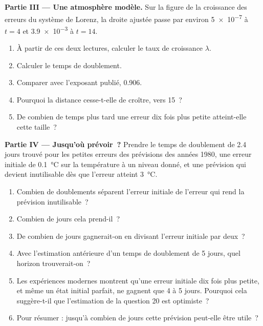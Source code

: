 \begin{problem}
\medskip\noindent\textbf{Partie III --- Une atmosphère modèle.}
Sur la figure de la croissance des erreurs du système de Lorenz, la droite ajustée passe par
environ \num{5e-7} à $t = 4$ et \num{3.9e-3} à $t = 14$.
\begin{enumerate}[resume]
  \item À partir de ces deux lectures, calculer le taux de croissance $\lambda$.
  \item Calculer le temps de doublement.
  \item Comparer avec l'exposant publié, 0.906.
  \item Pourquoi la distance cesse-t-elle de croître, vers 15~?
  \item De combien de temps plus tard une erreur dix fois plus petite atteint-elle cette taille~?
\end{enumerate}

\medskip\noindent\textbf{Partie IV --- Jusqu'où prévoir~?}
Prendre le temps de doublement de 2.4 jours trouvé pour les petites erreurs des prévisions des années 1980, une erreur
initiale de \qty{0.1}{\celsius} sur la température à un niveau donné, et une prévision qui devient inutilisable
dès que l'erreur atteint \qty{3}{\celsius}.
\begin{enumerate}[resume]
  \item Combien de doublements séparent l'erreur initiale de l'erreur qui rend la prévision inutilisable~?
  \item Combien de jours cela prend-il~?
  \item De combien de jours gagnerait-on en divisant l'erreur initiale par deux~?
  \item Avec l'estimation antérieure d'un temps de doublement de 5 jours, quel horizon trouverait-on~?
  \item Les expériences modernes montrent qu'une erreur initiale dix fois plus petite, et même un état initial parfait,
        ne gagnent que 4 à 5 jours. Pourquoi cela suggère-t-il que l'estimation de la
        question 20 est optimiste~?
  \item Pour résumer : jusqu'à combien de jours cette prévision peut-elle être utile~?
\end{enumerate}
\end{problem}
